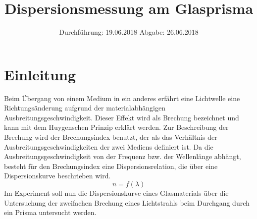 
\setlength{\parindent}{0 pt}

\subject{V402}
\title{Dispersionsmessung am Glasprisma}
\date{%
  Durchführung: 19.06.2018
  \hspace{3em}
  Abgabe: 26.06.2018
}



\maketitle
\thispagestyle{empty}
\tableofcontents
\newpage

\section{Einleitung}

Beim Übergang von einem Medium in ein anderes erfährt eine Lichtwelle eine Richtungsänderung
aufgrund der materialabhängigen Ausbreitungsgeschwindigkeit.
Dieser Effekt wird als Brechung bezeichnet und kann mit dem Huygenschen Prinzip erklärt werden.
Zur Beschreibung der Brechung wird der Brechungsindex benutzt, der als das Verhältnis
der Ausbreitungsgeschwindigkeiten der zwei Mediens definiert ist.
Da die Ausbreitungsgeschwindigkeit von der Frequenz bzw. der Wellenlänge abhängt,
besteht für den Brechungsindex eine Dispersionsrelation,
die über eine Dispersionskurve beschrieben wird.
\begin{equation*}
  n = f(\lambda)
\end{equation*}
Im Experiment soll nun die Dispersionskurve eines Glasmaterials
über die Untersuchung der zweifachen Brechung eines Lichtstrahls beim Durchgang durch ein Prisma untersucht werden.






\printbibliography{}


